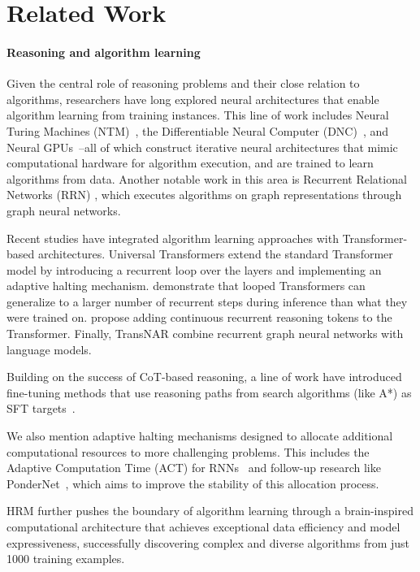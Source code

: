 \section{Related Work}

\paragraph{Reasoning and algorithm learning}
Given the central role of reasoning problems and their close relation to algorithms, researchers have long explored neural architectures that enable algorithm learning from training instances. This line of work includes Neural Turing Machines (NTM)~\citep{NTK2014}, the Differentiable Neural Computer (DNC)~\citep{DNC2016}, and Neural GPUs~\citep{KS-2016}--all of which construct iterative neural architectures that mimic computational hardware for algorithm execution, and are trained to learn algorithms from data.
Another notable work in this area is Recurrent Relational Networks (RRN) \cite{Palm2017RecurrentRN}, which executes algorithms on graph representations through graph neural networks.

Recent studies have integrated algorithm learning approaches with Transformer-based architectures. 
Universal Transformers extend the standard Transformer model by introducing a recurrent loop over the layers and implementing an adaptive halting mechanism. \citet{geiping2025} demonstrate that looped Transformers can generalize to a larger number of recurrent steps during inference than what they were trained on. \citet{CoconutLatentReasoning2024} propose adding continuous recurrent reasoning tokens to the Transformer. Finally, TransNAR \cite{Bounsi2024TransformersMN} combine recurrent graph neural networks with language models.

Building on the success of CoT-based reasoning, a line of work have introduced fine-tuning methods that use reasoning paths from search algorithms (like A*) as SFT targets~\cite{Liu2023GoatFL, searchformer2024, dualformer2025}.

We also mention adaptive halting mechanisms designed to allocate additional computational resources to more challenging problems. This includes the Adaptive Computation Time (ACT) for RNNs~\cite{Graves2016AdaptiveCT} and follow-up research like PonderNet~\cite{Banino2021PonderNetLT}, which aims to improve the stability of this allocation process.

HRM further pushes the boundary of algorithm learning through a brain-inspired computational architecture that achieves exceptional data efficiency and model expressiveness, successfully discovering complex and diverse algorithms from just 1000 training examples.

